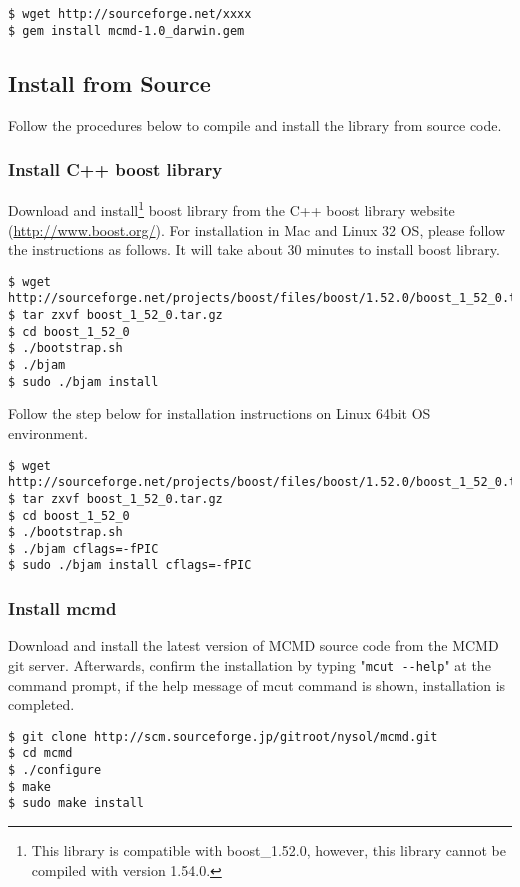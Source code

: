 \begin{Verbatim}[baselinestretch=0.7,frame=single]
$ wget http://sourceforge.net/xxxx
$ gem install mcmd-1.0_darwin.gem
\end{Verbatim}

\subsection{Install from Source \label{sect:install_source}}
Follow the procedures below to compile and install the library from source code. 

\subsubsection{Install C++ boost library}

Download and install\footnote{This library is compatible with boost\_1.52.0, however, this library cannot be compiled with version 1.54.0.} boost library from the C++ boost library website  (\url{http://www.boost.org/}).
For installation in Mac and Linux 32 OS, please follow the instructions as follows. It will take about 30 minutes to install boost library.  

\begin{Verbatim}[baselinestretch=0.7,frame=single]
$ wget http://sourceforge.net/projects/boost/files/boost/1.52.0/boost_1_52_0.tar.gz/download
$ tar zxvf boost_1_52_0.tar.gz
$ cd boost_1_52_0
$ ./bootstrap.sh
$ ./bjam
$ sudo ./bjam install
\end{Verbatim}

Follow the step below for installation instructions on Linux 64bit OS environment. 

\begin{Verbatim}[baselinestretch=0.7,frame=single]
$ wget http://sourceforge.net/projects/boost/files/boost/1.52.0/boost_1_52_0.tar.gz/download
$ tar zxvf boost_1_52_0.tar.gz
$ cd boost_1_52_0
$ ./bootstrap.sh
$ ./bjam cflags=-fPIC
$ sudo ./bjam install cflags=-fPIC
\end{Verbatim}

\subsubsection{Install mcmd}
Download and install the latest version of MCMD source code from the MCMD git server. Afterwards, confirm the installation by typing "\verb|mcut --help|" at the command prompt, if the help message of mcut command is shown, installation is completed. 


\begin{Verbatim}[baselinestretch=0.7,frame=single]
$ git clone http://scm.sourceforge.jp/gitroot/nysol/mcmd.git
$ cd mcmd
$ ./configure
$ make
$ sudo make install
\end{Verbatim}

%
